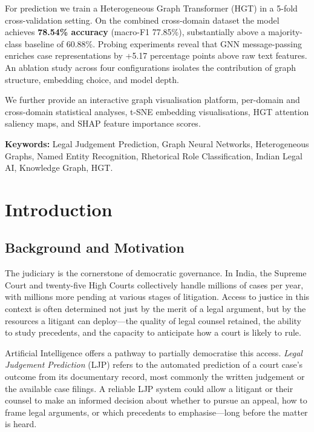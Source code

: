 \documentclass[12pt,a4paper]{report}
\begin{document}
For prediction we train a Heterogeneous Graph Transformer (HGT) in a 5-fold cross-validation setting. On the combined cross-domain dataset the model achieves \textbf{78.54\% accuracy} (macro-F1 77.85\%), substantially above a majority-class baseline of 60.88\%. Probing experiments reveal that GNN message-passing enriches case representations by +5.17 percentage points above raw text features. An ablation study across four configurations isolates the contribution of graph structure, embedding choice, and model depth.

We further provide an interactive graph visualisation platform, per-domain and cross-domain statistical analyses, t-SNE embedding visualisations, HGT attention saliency maps, and SHAP feature importance scores.

\textbf{Keywords:} Legal Judgement Prediction, Graph Neural Networks, Heterogeneous Graphs, Named Entity Recognition, Rhetorical Role Classification, Indian Legal AI, Knowledge Graph, HGT.

\tableofcontents
\listoffigures
\listoftables

\chapter{Introduction}
\label{chap:introduction}

\section{Background and Motivation}
\label{sec:background}

The judiciary is the cornerstone of democratic governance. In India, the Supreme Court and twenty-five High Courts collectively handle millions of cases per year, with millions more pending at various stages of litigation. Access to justice in this context is often determined not just by the merit of a legal argument, but by the resources a litigant can deploy---the quality of legal counsel retained, the ability to study precedents, and the capacity to anticipate how a court is likely to rule.

Artificial Intelligence offers a pathway to partially democratise this access. \textit{Legal Judgement Prediction} (LJP) refers to the automated prediction of a court case's outcome from its documentary record, most commonly the written judgement or the available case filings. A reliable LJP system could allow a litigant or their counsel to make an informed decision about whether to pursue an appeal, how to frame legal arguments, or which precedents to emphasise---long before the matter is heard.
\end{document}
